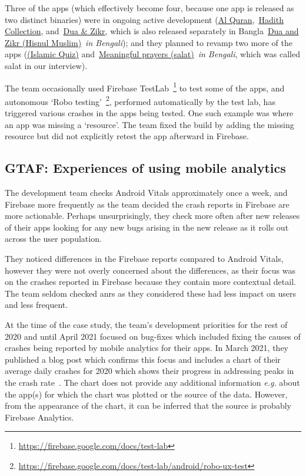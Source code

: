 Three of the apps (which effectively become four, because one app is released as two distinct binaries) were in ongoing active development (\href{https://play.google.com/store/apps/details?id=com.greentech.quran}{Al Quran},~\href{https://play.google.com/store/apps/details?id=com.greentech.hadith}{Hadith Collection}, and~\href{https://play.google.com/store/apps/details?id=com.greentech.hisnulmuslim}{Dua \& Zikr}, which is also released separately in Bangla~\href{https://play.google.com/store/apps/details?id=com.greentech.hisnulmuslimbn}{{Dua and Zikr (Hisnul Muslim)}}~\emph{in Bengali}); and they planned to revamp two more of the apps (\href{https://play.google.com/store/apps/details?id=com.greentech.islamicquiz}{(Islamic Quiz)} and~\href{https://play.google.com/store/apps/details?id=com.greentech.salatbn}{Meaningful prayers (salat)}~\textit{in Bengali}, which was called salat in our interview).

The team occasionally used Firebase TestLab~\footnote{\url{https://firebase.google.com/docs/test-lab}} to test some of the apps, and autonomous `Robo testing'~\footnote{\url{https://firebase.google.com/docs/test-lab/android/robo-ux-test}}, performed automatically by the test lab, has triggered various crashes in the apps being tested. One such example was where an app was missing a `resource'. The team fixed the build by adding the missing resource but did not explicitly retest the app afterward in Firebase.  

\subsection{GTAF: Experiences of using mobile analytics}
The development team checks Android Vitals approximately once a week, and Firebase more frequently as the team decided the crash reports in Firebase are more actionable. Perhaps unsurprisingly, they check more often after new releases of their apps looking for any new bugs arising in the new release as it rolls out across the user population.

They noticed differences in the Firebase reports compared to Android Vitals, however they were not overly concerned about the differences, as their focus was on the crashes reported in Firebase because they contain more contextual detail. The team seldom checked \acrshort{anr}s as they considered these had less impact on users and less frequent. %

At the time of the case study, the team's development priorities for the rest of 2020 and until April 2021 focused on bug-fixes which included fixing the causes of crashes being reported by mobile analytics for their apps. In March 2021, they published a blog post which confirms this focus and includes a chart of their average daily crashes for 2020 which shows their progress in addressing peaks in the crash rate~. The chart does not provide any additional information \emph{e.g.} about the app(s) for which the chart was plotted or the source of the data. However, from the appearance of the chart, it can be inferred that the source is probably Firebase Analytics.

